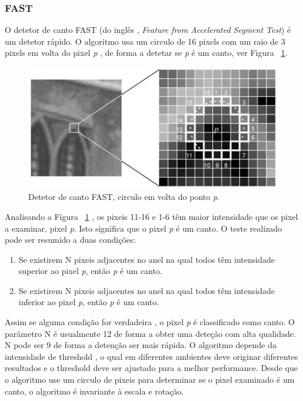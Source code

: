 \subsubsection{FAST}\label{fastsection}

O detetor de canto FAST (do inglês ,\textit{ Feature from Accelerated Segment Test}) é um detetor rápido. O algoritmo usa um circulo de 16 pixels com um raio de 3 pixels em volta do pixel \textit{p} , de forma a detetar se \textit{p} é um canto, ver Figura ~\ref{fig:fastcornerdetector}.

\begin{figure}[h!]
	\centering
	\includegraphics[width=0.7\linewidth]{figures/FASTcornerdetector}
	\caption{Detetor de canto FAST, circulo em volta do ponto \textit{p}. \cite{VisualOdometryRodasVehicles}}
	\label{fig:fastcornerdetector}
\end{figure}

Analisando a Figura  ~\ref{fig:fastcornerdetector} , os pixeis 11-16 e 1-6 têm maior intensidade que os pixel a examinar, pixel \textit{p}. Isto significa que o pixel \textit{p} é um canto. O teste realizado pode ser resumido a duas condições:
\begin{enumerate}
	\item Se existirem N pixeis adjacentes no anel na qual todos têm intensidade superior ao pixel \textit{p}, então \textit{p} é um canto.
	\item Se existirem N pixeis adjacentes no anel na qual todos têm intensidade inferior ao pixel \textit{p}, então \textit{p} é um canto.	
\end{enumerate}
Assim se alguma condição for verdadeira , o pixel \textit{p} é classificado como canto. O parâmetro N é usualmente 12 de forma a obter uma deteção com alta qualidade. N pode ser 9 de forma a detenção ser mais rápida. 
O algoritmo depende da intensidade de threshold , o qual em diferentes ambientes deve originar diferentes resultados e o threshold deve ser ajustado para a melhor performance. Desde que o algoritmo use um circulo de pixeis para determinar se o pixel examinado é um canto, o algoritmo é invariante à escala e rotação.


